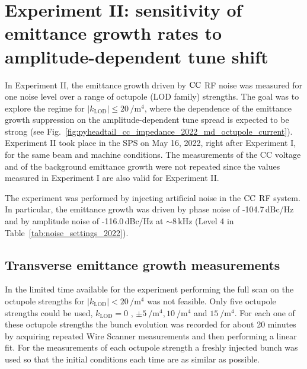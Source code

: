 \section{Experiment II: sensitivity of emittance growth rates to amplitude-dependent tune shift}\label{subsec:cc_md_2022_octupole_scan}

In Experiment II, the emittance growth driven by ${\mathrm{CC}}$ RF noise was measured for one noise level over a range of octupole (LOD family) strengths. The goal was to explore the regime for $|k_\mathrm{LOD} |\leq 20$\,$\mathrm{/m^4}$, where the dependence of the emittance growth suppression on the amplitude-dependent tune spread is expected to be strong (see Fig.~\ref{fig:pyheadtail_cc_impedance_2022_md_octupole_current}). Experiment II took place in the SPS on May 16, 2022, right after Experiment I, for the same beam and machine conditions. The measurements of the CC voltage and of the background emittance growth were not repeated since the values measured in Experiment I are also valid for Experiment II.

The experiment was performed by injecting artificial noise in the ${\mathrm{CC}}$ RF system. In particular, the emittance growth was driven by phase noise of -104.7\,dBc/Hz and by amplitude noise of -116.0\,dBc/Hz at $\sim$8\,kHz (Level 4 in Table~\ref{tab:noise_settings_2022}). 



\subsection{Transverse emittance growth measurements}\label{subsec:emit_growth_exp2}

In the limited time available for the experiment performing the full scan on the octupole strengths for $|k_\mathrm{LOD}| < 20$\,$\mathrm{/m^4}$ was not feasible. Only five octupole strengths could be used, $k_\mathrm{LOD} = 0$%
, $\pm 5 \ \mathrm{/m^4}, 10 \ \mathrm{/m^4}$ and $15 \ \mathrm{/m^4}$. %
For each one of these octupole strengths the bunch evolution was recorded for about 20 minutes by acquiring repeated Wire Scanner measurements and then performing a linear fit. For the measurements of each octupole strength a freshly injected bunch was used so that the initial conditions each time are as similar as possible.


